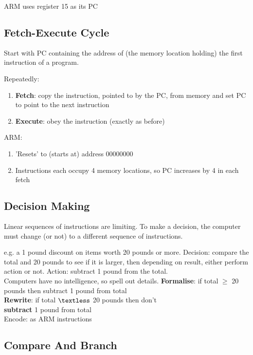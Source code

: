 \documentclass{article}
\begin{document}
ARM uses register 15 as its PC

\subsection{Fetch-Execute Cycle}
Start with PC containing the address of (the memory location holding) the first instruction of a program.

Repeatedly:
\begin{enumerate}
	\item \textbf{Fetch}: copy the instruction, pointed to by the PC, from memory and set PC to point to the next instruction
	\item \textbf{Execute}:  obey the instruction (exactly as before)
\end{enumerate}
ARM:
\begin{enumerate}
	\item 'Resets' to (starts at) address 00000000
	\item Instructions each occupy 4 memory locations, so PC increases by 4 in each fetch
\end{enumerate}

\subsection{Decision Making}
Linear sequences of instructions are limiting. To make a decision, the computer must change (or not) to a
different sequence of instructions.

e.g. a 1 pound discount on items worth 20 pounds or more.
Decision: compare the total and 20 pounds to see if it is larger, then depending on result, either perform action or not.
Action: subtract 1 pound from the total.\\

Computers have no intelligence, so spell out details.
\textbf{Formalise}: if total \(\geq\) 20 pounds then subtract 1 pound from total\\
\textbf{Rewrite}: if total \(\textless\) 20 pounds then don’t\\
\textbf{subtract} 1 pound from total\\
Encode: as ARM instructions

\subsection{Compare And Branch}
\end{document}
